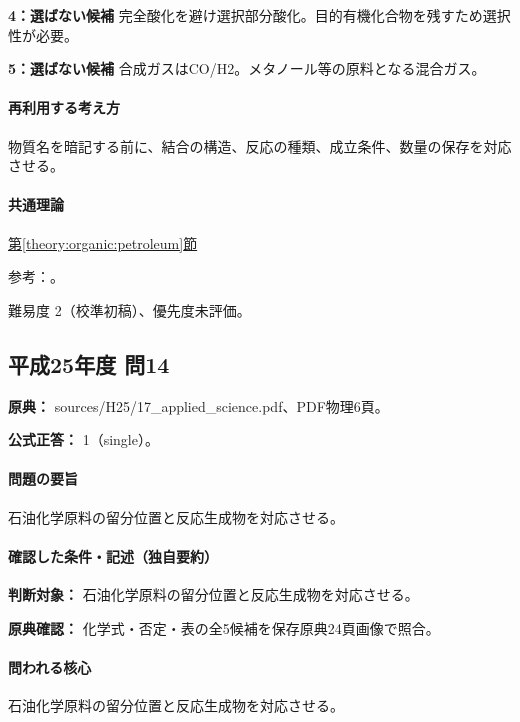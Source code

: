 \noindent\textbf{4：選ばない候補} 完全酸化を避け選択部分酸化。目的有機化合物を残すため選択性が必要。\par

\noindent\textbf{5：選ばない候補} 合成ガスはCO/H2。メタノール等の原料となる混合ガス。\par

\paragraph{再利用する考え方} 物質名を暗記する前に、結合の構造、反応の種類、成立条件、数量の保存を対応させる。

\paragraph{共通理論} \hyperref[theory:organic:petroleum]{第\ref*{theory:organic:petroleum}節}

\par 参考：\cite{organic_jpca,organic_gasoline}。

\par 難易度 2（校準初稿）、優先度未評価。

\subsection{平成25年度 問14}
\label{q:h25-reg-applied-14}

\noindent\textbf{原典：} sources/H25/17\_applied\_science.pdf、PDF物理6頁。

\textbf{公式正答：} 1（single）。

\paragraph{問題の要旨} 石油化学原料の留分位置と反応生成物を対応させる。

\paragraph{確認した条件・記述（独自要約）}\mbox{}\par

\noindent\textbf{判断対象：} 石油化学原料の留分位置と反応生成物を対応させる。\par

\noindent\textbf{原典確認：} 化学式・否定・表の全5候補を保存原典24頁画像で照合。\par

\paragraph{問われる核心} 石油化学原料の留分位置と反応生成物を対応させる。

